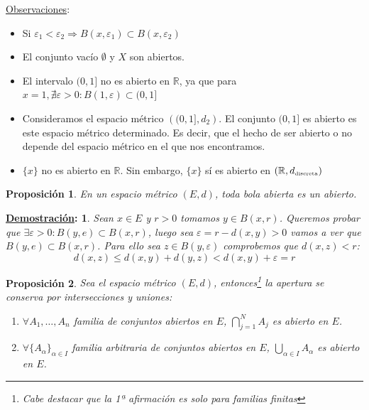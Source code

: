 \documentclass[10pt,a4paper,openright]{book}
\theoremstyle{break}
\newtheorem*{prop}{Proposición}
\newtheorem*{demo}{\underline{Demostración}:}
\begin{document}
\underline{Observaciones}:
\begin{itemize}
\item Si $\varepsilon_1 < \varepsilon_2 \Rightarrow B(x,\varepsilon_1) \subset B(x,\varepsilon_2)$

\item El conjunto vacío $\emptyset$ y $X$ son abiertos.

\item El intervalo $(0,1]$ no es abierto en $\mathbb{R}$, ya que para $x=1, \nexists \varepsilon > 0 : B(1,\varepsilon) \subset (0,1]$

\item Consideramos el espacio métrico $\left( (0,1], d_2 \right)$. El conjunto $(0,1]$ es abierto es este espacio métrico determinado. Es decir, que el hecho de ser abierto o no depende del espacio métrico en el que nos encontramos.

\item $\{x\}$ no es abierto en $\mathbb{R}$. Sin embargo, $\{x\}$ sí es abierto en $(\mathbb{R}, d_{\mbox{\tiny discreta}})$

\end{itemize}


\begin{prop}
En un espacio métrico $(E,d)$, toda bola abierta es un abierto.
\end{prop}

\begin{demo}
Sean $x \in E$ y $r>0$ tomamos $y \in B(x,r)$. Queremos probar que $\exists \varepsilon > 0 : B(y,e) \subset B(x,r)$, luego sea $\varepsilon = r - d(x,y) > 0$ vamos a ver que $B(y,e) \subset B(x,r)$. Para ello sea $z \in B(y, \varepsilon)$ comprobemos que $d(x,z) < r$:
$$d(x,z) \leq d(x,y) + d(y,z) < d(x,y) + \varepsilon = r$$
\end{demo}

\begin{prop}
Sea el espacio métrico $(E,d)$, entonces\footnote{Cabe destacar que la 1ª afirmación es solo para familias finitas} la apertura se conserva por intersecciones y uniones:
\begin{enumerate}
\item $\forall A_1, \ldots, A_n$ familia de conjuntos abiertos en $E$, $\displaystyle\bigcap_{j=1}^N A_j$ es abierto en $E$.

\item $\forall \{A_\alpha\}_{\alpha \in I}$ familia arbitraria de conjuntos abiertos en $E$, $\displaystyle \bigcup_{\alpha \in I} A_\alpha$ es abierto en $E$.
\end{enumerate}
\end{prop}
\end{document}
